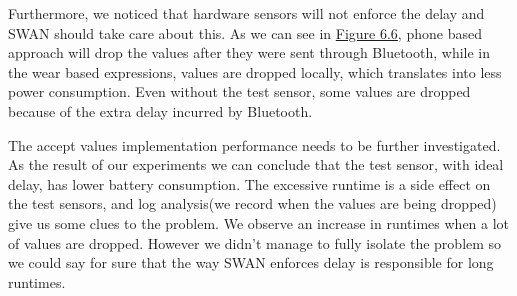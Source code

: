 Furthermore, we noticed that hardware sensors will not enforce the delay and SWAN should take care about this. As we can see in \hyperref[fig:swan_drop_val]{Figure 6.6}, 
phone based approach will drop the values after they were sent through Bluetooth, while in the wear based expressions, values are dropped locally, which translates into less power consumption.
Even without the test sensor, some values are dropped because of the extra delay incurred by Bluetooth.

 The accept values implementation performance needs to be further investigated.
 As the result of our experiments we can conclude that the test sensor, with ideal delay, has lower battery consumption.
 The excessive runtime is a side effect on the test sensors, and log analysis(we record when the values are being dropped) give us some clues to the problem.
 We observe an increase in runtimes when a lot of values are dropped. However we didn't manage to fully isolate the
 problem so we could say for sure that the way SWAN enforces delay is responsible for long runtimes.



